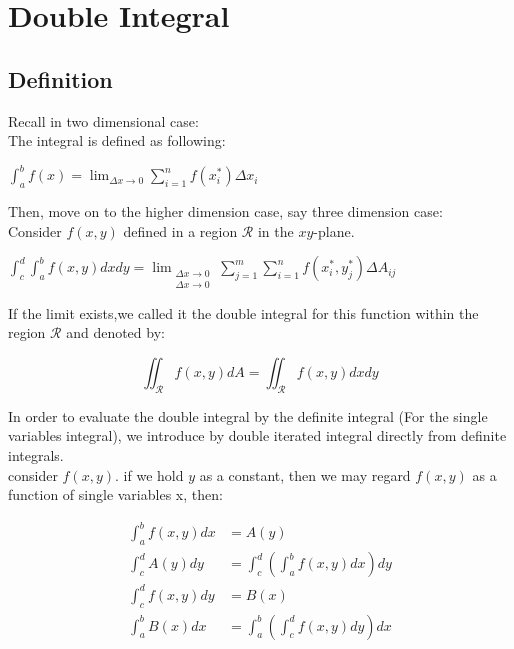 \documentclass[UTF8,a4paper, 10pt, openany]{svmono}
\begin{document}
\section{Double Integral}
\subsection{Definition}
Recall in two dimensional case:\\

The integral is defined as following:

\begin{center}
$\displaystyle\int_{a}^{b}f(x)=\lim_{\Delta x\to 0}\displaystyle\sum_{i=1}^{n} f(x_i^*)\Delta x_i$
\end{center}

Then, move on to the higher dimension case, say three dimension case:\\

Consider $f(x,y)$ defined in a region $\mathcal{R}$ in the $xy$-plane.

\begin{center}
$\displaystyle\int_{c}^{d}\displaystyle\int_{a}^{b}f(x,y)dxdy =\lim_{\substack{\Delta x\to 0\\ \Delta x\to 0}}\displaystyle\sum_{j=1}^{m}\displaystyle\sum_{i=1}^{n} f(x_i^*,y_j^*)\Delta A_{ij}$
\end{center}

If the limit exists,we called it the double integral for this function within the region $\mathcal{R}$ and denoted by:

\begin{equation}
\boxed{\iint_{\mathcal{R}}f(x,y)dA=\iint_{\mathcal{R}}f(x,y)dxdy}
\end{equation}

In order to evaluate the double integral by the definite integral (For the single variables integral), we introduce by double iterated integral directly from definite integrals.\\

consider $f(x,y)$. if we hold $y$ as a constant, then we may regard $f(x,y)$ as a function of single variables x, then:

\begin{align*}
\displaystyle\int_{a}^{b}f(x,y)dx &= A(y)\\
\displaystyle\int_{c}^{d}A(y)dy &= \displaystyle\int_{c}^{d}\left(\displaystyle\int_{a}^{b}f(x,y)dx\right)dy\\
\displaystyle\int_{c}^{d}f(x,y)dy &= B(x)\\
\displaystyle\int_{a}^{b}B(x)dx &= \displaystyle\int_{a}^{b}\left(\displaystyle\int_{c}^{d}f(x,y)dy\right)dx\\
\end{align*}
\end{document}
